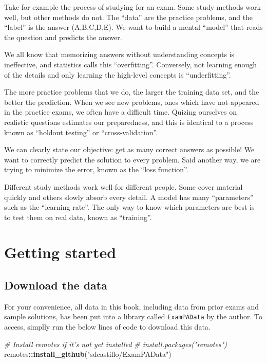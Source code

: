 \documentclass[openany]{book}
\newenvironment{Shaded}{\begin{snugshade}}{\end{snugshade}}
\newcommand{\CommentTok}[1]{\textcolor[rgb]{0.56,0.35,0.01}{\textit{#1}}}
\newcommand{\KeywordTok}[1]{\textcolor[rgb]{0.13,0.29,0.53}{\textbf{#1}}}
\newcommand{\NormalTok}[1]{#1}
\newcommand{\OperatorTok}[1]{\textcolor[rgb]{0.81,0.36,0.00}{\textbf{#1}}}
\newcommand{\StringTok}[1]{\textcolor[rgb]{0.31,0.60,0.02}{#1}}
\begin{document}
Take for example the process of studying for an exam. Some study methods work well, but other methods do not. The ``data'' are the practice problems, and the ``label'' is the answer (A,B,C,D,E). We want to build a mental ``model'' that reads the question and predicts the answer.

We all know that memorizing answers without understanding concepts is ineffective, and statistics calls this ``overfitting''. Conversely, not learning enough of the details and only learning the high-level concepts is ``underfitting''.

The more practice problems that we do, the larger the training data set, and the better the prediction. When we see new problems, ones which have not appeared in the practice exams, we often have a difficult time. Quizing ourselves on realistic questions estimates our preparedness, and this is identical to a process known as ``holdout testing'' or ``cross-validation''.

We can clearly state our objective: get as many correct answers as possible! We want to correctly predict the solution to every problem. Said another way, we are trying to minimize the error, known as the ``loss function''.

Different study methods work well for different people. Some cover material quickly and others slowly absorb every detail. A model has many ``parameters'' such as the ``learning rate''. The only way to know which parameters are best is to test them on real data, known as ``training''.

\hypertarget{getting-started}{%
\chapter{Getting started}\label{getting-started}}

\hypertarget{download-the-data}{%
\section{Download the data}\label{download-the-data}}

For your convenience, all data in this book, including data from prior exams and sample solutions, has been put into a library called \texttt{ExamPAData} by the author. To access, simplly run the below lines of code to download this data.

\begin{Shaded}
\begin{Highlighting}[]
\CommentTok{# Install remotes if it's not yet installed}
\CommentTok{# install.packages("remotes")}
\NormalTok{remotes}\OperatorTok{::}\KeywordTok{install_github}\NormalTok{(}\StringTok{"sdcastillo/ExamPAData"}\NormalTok{)}
\end{Highlighting}
\end{Shaded}
\end{document}
